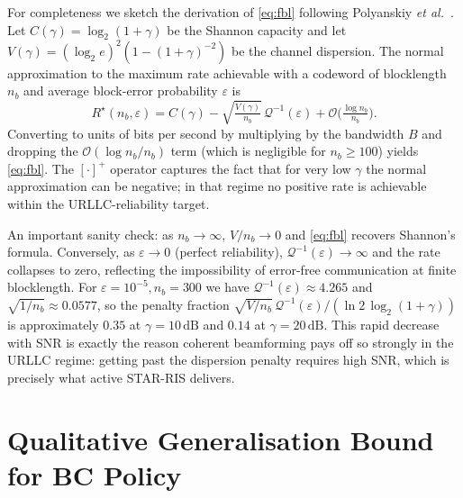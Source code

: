 \documentclass[journal]{IEEEtran}
\newcommand{\Qfunc}{\mathcal{Q}}
\begin{document}
For completeness we sketch the derivation of \eqref{eq:fbl}
following Polyanskiy \emph{et al.}~\cite{polyanskiy2010channel}.
Let $C(\gamma)\!=\!\log_2(1+\gamma)$ be the Shannon capacity and
let $V(\gamma)\!=\!(\log_2 e)^2 (1-(1+\gamma)^{-2})$ be the channel
dispersion. The normal approximation to the maximum rate achievable
with a codeword of blocklength $n_b$ and average block-error
probability $\varepsilon$ is
\begin{equation}
  R^{\star}(n_b,\varepsilon)\!=\!C(\gamma)\!-\!\sqrt{\tfrac{V(\gamma)}{n_b}}\,\Qfunc^{-1}(\varepsilon)
  +\mathcal{O}\!\bigl(\tfrac{\log n_b}{n_b}\bigr).
  \label{eq:fbl-normal}
\end{equation}
Converting to units of bits per second by multiplying by the
bandwidth $B$ and dropping the $\mathcal{O}(\log n_b/n_b)$ term
(which is negligible for $n_b\!\ge\!100$) yields
\eqref{eq:fbl}. The $[\cdot]^{+}$ operator captures the fact that
for very low $\gamma$ the normal approximation can be negative; in
that regime no positive rate is achievable within the
URLLC-reliability target.

An important sanity check: as $n_b\!\to\!\infty$, $V/n_b\!\to\!0$
and \eqref{eq:fbl} recovers Shannon's formula. Conversely, as
$\varepsilon\!\to\!0$ (perfect reliability), $\Qfunc^{-1}(\varepsilon)\!\to\!\infty$
and the rate collapses to zero, reflecting the impossibility of
error-free communication at finite blocklength. For
$\varepsilon\!=\!10^{-5},n_b\!=\!300$ we have
$\Qfunc^{-1}(\varepsilon)\!\approx\!4.265$ and
$\sqrt{1/n_b}\!\approx\!0.0577$, so the penalty fraction
$\sqrt{V/n_b}\,\Qfunc^{-1}(\varepsilon)/(\ln 2\,\log_2(1+\gamma))$
is approximately $0.35$ at $\gamma\!=\!10\,\text{dB}$ and
$0.14$ at $\gamma\!=\!20\,\text{dB}$. This rapid decrease with SNR
is exactly the reason coherent beamforming pays off so strongly in
the URLLC regime: getting past the dispersion penalty requires
high SNR, which is precisely what active STAR-RIS delivers.

\section{Qualitative Generalisation Bound for BC Policy}
\label{app:bc}
\end{document}
